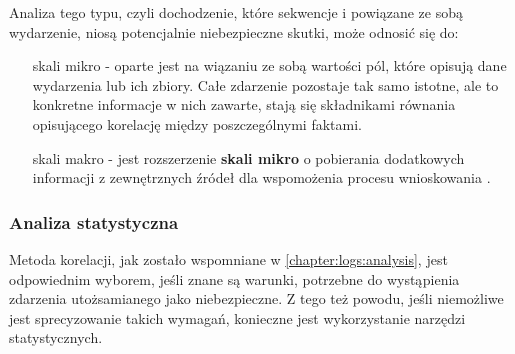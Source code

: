         Analiza tego typu, czyli dochodzenie, które sekwencje i powiązane ze sobą wydarzenie, niosą
        potencjalnie niebezpieczne skutki, może odnosić się do:
        \begin{itemize}
            \item[skali mikro] - oparte jest na wiązaniu ze sobą wartości pól, które opisują dane wydarzenia lub
            ich zbiory. Całe zdarzenie pozostaje tak samo istotne, ale to konkretne informacje w nich zawarte,
            stają się składnikami równania opisującego korelację między poszczególnymi faktami. 
            \item[skali makro] - jest rozszerzenie \textbf{skali mikro} o pobierania dodatkowych informacji z zewnętrznych 
            źródeł dla wspomożenia procesu wnioskowania \cite{logging_log_management}. 
        \end{itemize}
        
        \subsubsection{Analiza statystyczna}
        Metoda korelacji, jak zostało wspomniane w \ref{chapter:logs:analysis}, jest odpowiednim wyborem, jeśli
        znane są warunki, potrzebne do wystąpienia zdarzenia utożsamianego jako niebezpieczne. Z tego też powodu,
        jeśli niemożliwe jest sprecyzowanie takich wymagań, konieczne jest wykorzystanie narzędzi statystycznych.
        
